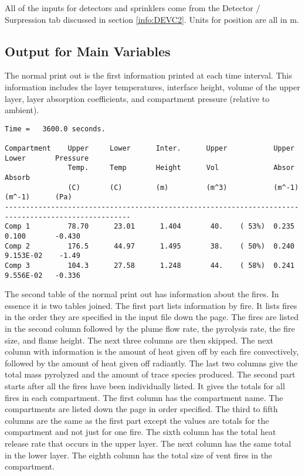 All of the inputs for detectors and sprinklers come from the Detector / Surpression tab discussed in section \ref{info:DEVC2}. Units for position are all in m.

\subsection{Output for Main Variables}

The normal print out is the first information printed at each time interval.  This information includes the layer temperatures, interface height, volume of the upper layer, layer absorption coefficients, and compartment pressure (relative to ambient).

\begin{lstlisting}[basicstyle=\tiny]
Time =   3600.0 seconds.

Compartment    Upper     Lower      Inter.      Upper           Upper      Lower       Pressure
               Temp.     Temp       Height      Vol             Absor      Absorb
               (C)       (C)        (m)         (m^3)           (m^-1)     (m^-1)      (Pa)
----------------------------------------------------------------------------------------------------
Comp 1         78.70      23.01      1.404       40.    ( 53%)  0.235      0.100       -0.430
Comp 2         176.5      44.97      1.495       38.    ( 50%)  0.240      9.153E-02    -1.49
Comp 3         104.3      27.58      1.248       44.    ( 58%)  0.241      9.556E-02   -0.336
\end{lstlisting}
The second table of the normal print out has information about the fires.  In essence it is two tables joined.  The first part lists information by fire. It lists fires in the order they are specified in the input file down the page.  The fires are listed in the second column followed by the plume flow rate, the pyrolysis rate, the fire size, and flame height.  The next three columns are then skipped.  The next column with information is the amount of heat given off by each fire convectively, followed by the amount of heat given off radiantly. The last two columns give the total mass pyrolyzed and the amount of trace species produced.  The second part starts after all the fires have been individually listed.  It gives the totals for all fires in each compartment.  The first column has the compartment name.  The compartments are listed down the page in order specified.  The third to fifth columns are the same as the first part except the values are totals for the compartment and not just for one fire.  The sixth column has the total heat release rate that occurs in the upper layer.  The next column has the same total in the lower layer.  The eighth column has the total size of vent fires in the compartment.

